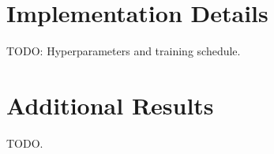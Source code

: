 \section{Implementation Details}
\label{app:impl}

TODO: Hyperparameters and training schedule.

\section{Additional Results}
\label{app:results}

TODO.
